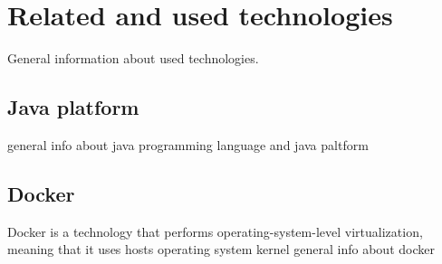 \section{Related and used technologies}\label{sec:related-technologies}
General information about used technologies.

\subsection{Java platform}\label{subsec:tech-java}
general info about java programming language and java paltform

\subsection{Docker}\label{subsec:tech-docker}
Docker is a technology that performs operating-system-level virtualization,
meaning that it uses hosts operating system kernel
general info about docker 